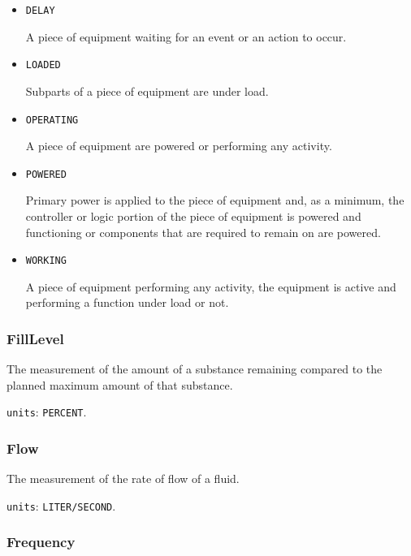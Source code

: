 \begin{itemize}

\item \texttt{DELAY}


A piece of equipment waiting for an event or an action to occur.

\item \texttt{LOADED}


Subparts of a piece of equipment are under load.

\item \texttt{OPERATING}


A piece of equipment are powered or performing any activity.

\item \texttt{POWERED}


Primary  power is  applied  to the  piece  of  equipment and,  as  a minimum, the controller or logic portion of the piece of equipment is powered and functioning or components that are required to remain on are powered.

\item \texttt{WORKING}


A piece of equipment performing any activity, the equipment is active and performing a function under load or not.


\end{itemize}








\subsubsection{FillLevel}
\label{sec:FillLevel}



The measurement of the amount of a substance remaining compared to the planned maximum amount of that substance.


\texttt{units}: \texttt{PERCENT}.


\subsubsection{Flow}
\label{sec:Flow}



The measurement of the rate of flow of a fluid.


\texttt{units}: \texttt{LITER/SECOND}.


\subsubsection{Frequency}
\label{sec:Frequency}



